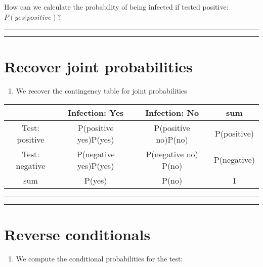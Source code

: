 \documentclass[
]{book}
\providecommand{\tightlist}{%
  \setlength{\itemsep}{0pt}\setlength{\parskip}{0pt}}
\begin{document}
How can we calculate the probability of being infected if tested positive: \(P(yes|positive)\)?

\begin{center}\rule{0.5\linewidth}{0.5pt}\end{center}

\begin{center}\rule{0.5\linewidth}{0.5pt}\end{center}

\hypertarget{recover-joint-probabilities}{%
\section{Recover joint probabilities}\label{recover-joint-probabilities}}

\begin{enumerate}
\def\labelenumi{\arabic{enumi}.}
\tightlist
\item
  We recover the contingency table for joint probabilities
\end{enumerate}

\begin{longtable}[]{@{}cccc@{}}
\toprule
& Infection: Yes & Infection: No & sum \\
\midrule
\endhead
Test: positive & P(positive {\textbar{}} yes)P(yes) & P(positive {\textbar{}} no)P(no) & P(positive) \\
Test: negative & P(negative {\textbar{}} yes)P(yes) & P(negative {\textbar{}} no) P(no) & P(negative) \\
sum & P(yes) & P(no) & 1 \\
\bottomrule
\end{longtable}

\begin{center}\rule{0.5\linewidth}{0.5pt}\end{center}

\begin{center}\rule{0.5\linewidth}{0.5pt}\end{center}

\hypertarget{reverse-conditionals}{%
\section{Reverse conditionals}\label{reverse-conditionals}}

\begin{enumerate}
\def\labelenumi{\arabic{enumi}.}
\setcounter{enumi}{1}
\tightlist
\item
  We compute the conditional probabilities for the test:
\end{enumerate}
\end{document}
